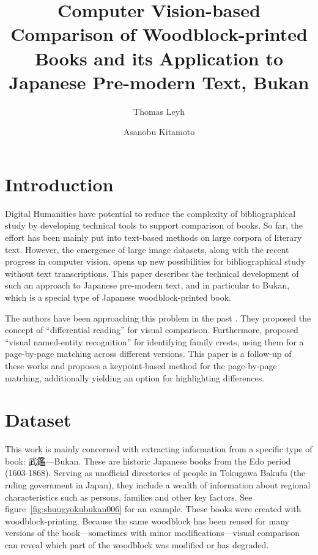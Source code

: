 \documentclass{ltjarticle}
\title{Computer Vision-based Comparison of Woodblock-printed Books and its Application to Japanese Pre-modern Text, Bukan}
\author[1,3]{Thomas Leyh}
\author[2,3]{Asanobu Kitamoto}
\affil[1]{University of Freiburg}
\affil[2]{ROIS-DS Center for Open Data in the Humanities}
\affil[3]{National Institute of Informatics}
\date{}
\begin{document}
\maketitle

\section{Introduction}

Digital Humanities have potential to reduce the complexity of bibliographical study by developing technical tools to support comparison of books. So far, the effort has been mainly put into text-based methods on large corpora of literary text. However, the emergence of large image datasets, along with the recent progress in computer vision, opens up new possibilities for bibliographical study without text transcriptions. This paper describes the technical development of such an approach to Japanese pre-modern text, and in particular to Bukan, which is a special type of Japanese woodblock-printed book.

The authors have been approaching this problem in the past \cite{kitamoto2018}. They proposed the concept of “differential reading” for visual comparison. Furthermore, \cite{hakim2019} proposed “visual named-entity recognition” for identifying family crests, using them for a page-by-page matching across different versions. This paper is a follow-up of these works and proposes a keypoint-based method for the page-by-page matching, additionally yielding an option for highlighting differences. 

\section{Dataset}

This work is mainly concerned with extracting information from a specific type of book: 武鑑---Bukan. These are historic Japanese books from the Edo period (1603-1868). Serving as unofficial directories of people in Tokugawa Bakufu (the ruling government in Japan), they include a wealth of information about regional characteristics such as persons, families and other key factors. See figure~\ref{fig:shuugyokubukan006} for an example. These books were created with woodblock-printing. Because the same woodblock has been reused for many versions of the book---sometimes with minor modifications---visual comparison can reveal which part of the woodblock was modified or has degraded.
\end{document}
